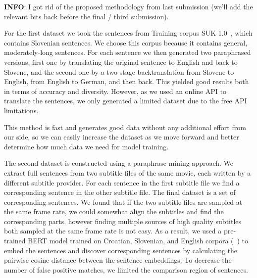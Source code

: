 \documentclass[fleqn,moreauthors,10pt]{ds_report}
\begin{document}
\textbf{INFO}: I got rid of the proposed methodology from last submission (we'll add the relevant bits back before the final / third submission).

For the first dataset we took the sentences from {Training corpus SUK 1.0}~\cite{11356/1747}, which contains  Slovenian sentences. We choose this corpus because it contains general, moderately-long sentences. For each sentence we then generated two paraphrased versions, first one by translating the original sentence to English and back to Slovene, and the second one by a two-stage backtranslation from Slovene to English, from English to German, and then back. This yielded good results both in terms of accuracy and diversity. However, as we used an online API to translate the sentences, we only generated a limited dataset due to the free API limitations.

This method is fast and generates good data without any additional effort from our side, so we can easily increase the dataset as we move forward and better determine how much data we need for model training.

The second dataset is constructed using a paraphrase-mining approach. We extract full sentences from two subtitle files of the same movie, each written by a different subtitle provider. For each sentence in the first subtitle file we find a corresponding sentence in the other subtitle file. The final dataset is a set of corresponding sentences. We found that if the two subtitle files are sampled at the same frame rate, we could somewhat align the subtitles and find the corresponding parts, however finding multiple sources of high quality subtitles both sampled at the same frame rate is not easy. As a result, we used a pre-trained BERT model trained on Croatian, Slovenian, and English corpora (~\cite{11356/1694}) to embed the sentences and discover corresponding sentences by calculating the pairwise cosine distance between the sentence embeddings. To decrease the number of false positive matches, we limited the comparison region of sentences. 
\end{document}
